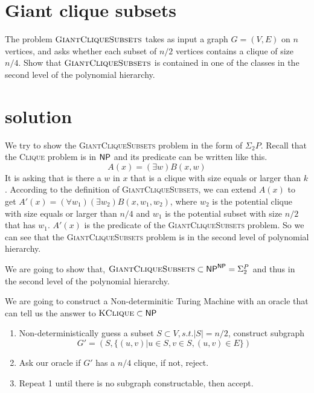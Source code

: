 

\maketitle
\thispagestyle{firststyle}
\vspace{-2.0cm}

\section*{Giant clique subsets}
    The problem $\textsc{GiantCliqueSubsets}$ takes as input a graph $G = (V,E)$ on $n$ vertices, and asks whether each subset of $n/2$ vertices contains a clique of size $n/4$. Show that $\textsc{GiantCliqueSubsets}$ is contained in one of the classes in the second level of the polynomial hierarchy.
 
\section*{solution}
We try to show the \textsc{GiantCliqueSubsets} problem in the form of $\Sigma_2P$. 
Recall that the \textsc{Clique} problem is in $\mathsf{NP}$ and its predicate can be written like this.
$$A(x) = (\exists w)B(x, w)$$
It is asking that is there a $w$ in $x$ that is a clique with size equals or larger than $k$. 
According to the definition of \textsc{GiantCliqueSubsets}, we can extend $A(x)$ to get $A'(x) = (\forall w_1)(\exists w_2)B(x, w_1, w_2)$, 
where $w_2$ is the potential clique with size equals or larger than $n/4$ and $w_1$ is the potential 
subset with size $n/2$ that has $w_1$. $A'(x)$ is the predicate of the \textsc{GiantCliqueSubsets} problem. 
So we can see that the \textsc{GiantCliqueSubsets} problem is in the second level of polynomial hierarchy.


We are going to show that, $\textsc{GiantCliqueSubsets} \subset \mathsf{NP}^{\mathsf{NP}} = \Sigma_2^P$ and thus in the second level of the polynomial hierarchy.

We are going to construct a Non-determinitic Turing Machine with an oracle that can tell us the answer to $\textsc{KClique} \subset \mathsf{NP}$

\begin{enumerate}
    \item Non-deterministically guess a subset $S \subset V, s.t. |S| = n/2$, 
    construct subgraph $$G' = (S, \{(u, v) | u \in S, v \in S, (u, v) \in E\})$$
    \item Ask our oracle if $G'$ has a $n/4$ clique, if not, reject.
    \item Repeat 1 until there is no subgraph constructable, then accept.
\end{enumerate}



